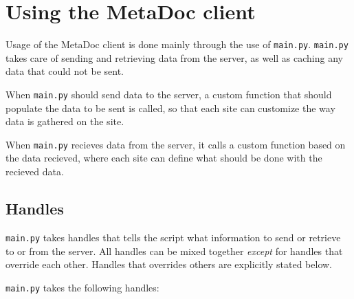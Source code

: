 \newpage
\section{Using the MetaDoc client}
Usage of the MetaDoc client is done mainly through the use of \texttt{main.py}.
\texttt{main.py} takes care of sending and retrieving data from the server, as
well as caching any data that could not be sent. 

When \texttt{main.py} should send data to the server, a custom function that
should populate the data to be sent is called, so that each site can customize
the way data is gathered on the site. 

When \texttt{main.py} recieves data from the server, it calls a custom function
based on the data recieved, where each site can define what should be done with
the recieved data.

\subsection{Handles}
\label{sec:handles}
\texttt{main.py} takes handles that tells the script what information to send
or retrieve to or from the server. All handles can be mixed together
\textit{except} for handles that override each other. Handles that overrides
others are explicitly stated below.

\texttt{main.py} takes the following handles:

